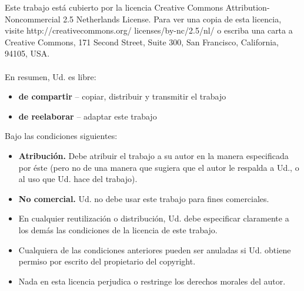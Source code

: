 ﻿\clearemptydoublepage
\noindent\thispagestyle{empty}
Este trabajo está cubierto por la licencia Creative Commons Attribution-Noncommercial 2.5 Netherlands License. Para ver una copia de esta licencia, visite http://creativecommons.org/ licenses/by-nc/2.5/nl/ o escriba una carta a Creative Commons, 171 Second Street, Suite 300, San Francisco, California, 94105, USA.\\\\
En resumen, Ud. es libre:
  \begin{itemize}
    \item \textbf{de compartir} -- copiar, distribuir y transmitir el trabajo
    \item \textbf{de reelaborar} -- adaptar este trabajo
  \end{itemize}
Bajo las condiciones siguientes:
  \begin{itemize}
    \item \textbf{Atribución.} Debe atribuir el trabajo a su autor en la manera especificada por éste (pero no de una manera que sugiera que el autor le respalda a Ud., o al uso que Ud. hace del trabajo).
    \item \textbf{No comercial.} Ud. no debe usar este trabajo para fines comerciales.
    \item En cualquier reutilización o distribución, Ud. debe especificar claramente a los demás las condiciones de la licencia de este trabajo. 
    \item Cualquiera de las condiciones anteriores pueden ser anuladas si Ud. obtiene permiso por escrito del propietario del copyright.
    \item Nada en esta licencia perjudica o restringe los derechos morales del autor.
  \end{itemize}
\normalsize


\clearemptydoublepage
